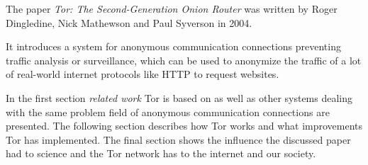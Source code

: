 
The paper \textit{Tor: The Second-Generation Onion Router} \cite{tor2004original} was written by Roger Dingledine, Nick Mathewson and Paul Syverson in 2004. 

It introduces a system for anonymous communication connections preventing traffic analysis or surveillance, which can be used to anonymize the traffic of a lot of real-world internet protocols like HTTP to request websites.





In the first section \textit{related work} Tor is based on as well as other systems dealing with the same problem field of anonymous communication connections are presented. The following section describes how Tor works and what improvements Tor has implemented. The final section shows the influence the discussed paper had to science and the Tor network has to the internet and our society.